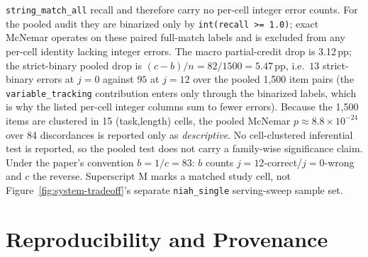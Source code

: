 \begin{table}[htbp]
{\texttt{string\_match\_all} recall and therefore carry no per-cell integer
error counts.  For the pooled audit they are binarized only by
\texttt{int(recall >= 1.0)}; exact McNemar operates on these paired full-match
labels and is excluded from any per-cell identity lacking integer errors.  The
macro partial-credit drop is 3.12\,pp; the strict-binary pooled drop is
$(c-b)/n=82/1500=5.47$\,pp, i.e.\ $13$ strict-binary errors at $j{=}0$ against
$95$ at $j{=}12$ over the pooled 1,500 item pairs (the \texttt{variable\_tracking}
contribution enters only through the binarized labels, which is why the listed
per-cell integer columns sum to fewer errors).  Because the 1,500 items are
clustered in 15 (task,length) cells, the pooled McNemar
$p{\approx}8.8{\times}10^{-24}$ over 84 discordances is reported only as
\emph{descriptive}.  No cell-clustered
inferential test is reported, so the pooled test does not carry a family-wise
significance claim.  Under the paper's convention $b{=}1/c{=}83$:
$b$ counts $j=12$-correct/$j=0$-wrong and $c$ the reverse.  Superscript M marks a matched
study cell, not Figure~\ref{fig:system-tradeoff}'s separate
\texttt{niah\_single} serving-sweep sample set.}
\label{tab:ruler-percell}
\end{table}

\clearpage
\section{Reproducibility and Provenance}
\label{app:repro}

